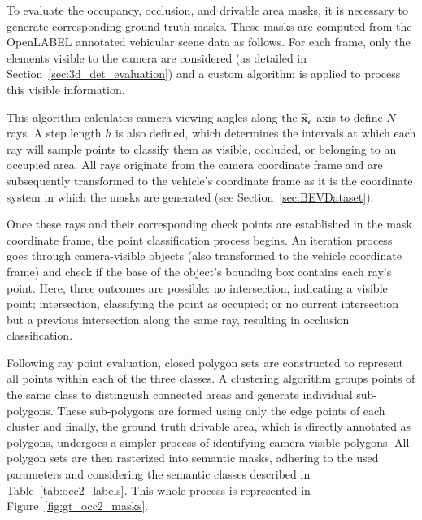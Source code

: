  \label{sec:bev_masks_evaluation_methodology}
To evaluate the occupancy, occlusion, and drivable area masks, it is necessary to generate corresponding ground truth masks. These masks are computed from the OpenLABEL annotated vehicular scene data as follows. For each frame, only the elements visible to the camera are considered (as detailed in Section~\ref{sec:3d_det_evaluation}) and a custom algorithm is applied to process this visible information.

This algorithm calculates camera viewing angles along the $\mathbf{\hat{x}_c}$ axis to define $N$ rays. A step length $h$ is also defined, which determines the intervals at which each ray will sample points to classify them as visible, occluded, or belonging to an occupied area. All rays originate from the camera coordinate frame and are subsequently transformed to the vehicle's coordinate frame as it is the coordinate system in which the  masks are generated (see Section~\ref{sec:BEVDataset}).

Once these rays and their corresponding check points are established in the  mask coordinate frame, the point classification process begins. An iteration process goes through camera-visible objects (also transformed to the vehicle coordinate frame) and check if the base of the object's bounding box contains each ray's point. Here, three outcomes are possible: no intersection, indicating a visible point; intersection, classifying the point as occupied; or no current intersection but a previous intersection along the same ray, resulting in occlusion classification.


Following ray point evaluation, closed polygon sets are constructed to represent all points within each of the three classes. A clustering algorithm groups points of the same class to distinguish connected areas and generate individual sub-polygons. These sub-polygons are formed using only the edge points of each cluster and finally, the ground truth drivable area, which is directly annotated as polygons, undergoes a simpler process of identifying camera-visible polygons. All polygon sets are then rasterized into semantic masks, adhering to the used  parameters and considering the semantic classes described in Table~\ref{tab:occ2_labels}. This whole process is represented in Figure~\ref{fig:gt_occ2_masks}.  

